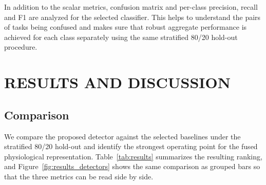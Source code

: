 \documentclass[a4paper,twoside]{article}
\begin{document}
In addition to the scalar metrics, confusion matrix and per-class precision, recall and F1 are analyzed for the selected classifier. This helps to understand the pairs of tasks being confused and makes sure that robust aggregate performance is achieved for each class separately using the same stratified 80/20 hold-out procedure.



\section{\uppercase{Results and Discussion}}\label{sec:results}

\subsection{Comparison}

\noindent We compare the proposed detector against the selected baselines under the stratified 80/20 hold-out and identify the strongest operating point for the fused physiological representation. Table~\ref{tab:results} summarizes the resulting ranking, and Figure~\ref{fig:results_detectors} shows the same comparison as grouped bars so that the three metrics can be read side by side.
\end{document}

